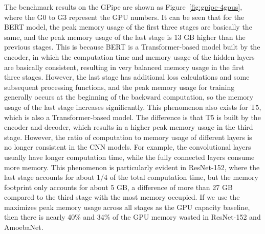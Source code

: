 The benchmark results on the GPipe are shown as Figure~\ref{fig:gpipe-4gpus},
where the G0 to G3 represent the GPU numbers.
It can be seen that for the BERT model,
the peak memory usage of the first three stages are basically the same,
and the peak memory usage of the last stage is 13 GB higher than the previous stages.
This is because BERT is a Transformer-based model built by the encoder,
in which the computation time and memory usage of the hidden layers are basically consistent,
resulting in very balanced memory usage in the first three stages.
However, the last stage has additional loss calculations
and some subsequent processing functions,
and the peak memory usage for training generally occurs
at the beginning of the backward computation,
so the memory usage of the last stage increases significantly.
This phenomenon also exists for T5, which is also a Transformer-based model.
The difference is that T5 is built by the encoder and decoder,
which results in a higher peak memory usage in the third stage.
However, the ratio of computation to memory usage
of different layers is no longer consistent in the CNN models.
For example, the convolutional layers usually have longer computation time,
while the fully connected layers consume more memory.
This phenomenon is particularly evident in ResNet-152,
where the last stage accounts for about 1/4 of the total computation time,
but the memory footprint only accounts for about 5 GB,
a difference of more than 27 GB compared to the third stage with the most memory occupied.
If we use the maximizes peak memory usage across all stages as the GPU capacity baseline,
then there is nearly 40\% and 34\% of the GPU memory wasted in ResNet-152 and AmoebaNet.

